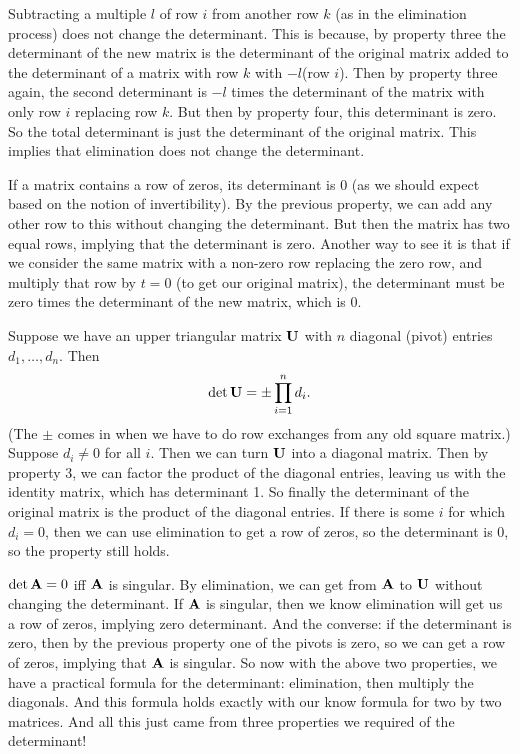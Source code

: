 \item Subtracting a multiple $l$ of row $i$ from another row $k$ (as in the elimination process) does not change the determinant. This is because, by property three the determinant of the new matrix is the determinant of the original matrix added to the determinant of a matrix with row $k$ with $-l$(row $i$). Then by property three again, the second determinant is $-l$ times the determinant of the matrix with only row $i$ replacing row $k$. But then by property four, this determinant is zero. So the total determinant is just the determinant of the original matrix. This implies that elimination does not change the determinant. 
\item If a matrix contains a row of zeros, its determinant is 0 (as we should expect based on the notion of invertibility). By the previous property, we can add any other row to this without changing the determinant. But then the matrix has two equal rows, implying that the determinant is zero. Another way to see it is that if we consider the same matrix with a non-zero row replacing the zero row, and multiply that row by $t=0$ (to get our original matrix), the determinant must be zero times the determinant of the new matrix, which is 0.
\item Suppose we have an upper triangular matrix $\boldsymbol{\mathbf{U}}$ with $n$ diagonal (pivot) entries $d_1, \ldots, d_n$. Then 
\[ \mathrm{det}\, \boldsymbol{\mathbf{U}} = \pm \prod_{i=1}^n d_i. \]
(The $\pm$ comes in when we have to do row exchanges from any old square matrix.) Suppose $d_i \ne 0$ for all $i$. Then we can turn $\boldsymbol{\mathbf{U}}$ into a diagonal matrix. Then by property 3, we can factor the product of the diagonal entries, leaving us with the identity matrix, which has determinant 1. So finally the determinant of the original matrix is the product of the diagonal entries. If there is some $i$ for which $d_i = 0$, then we can use elimination to get a row of zeros, so the determinant is 0, so the property still holds.
\item $\mathrm{det}\, \boldsymbol{\mathbf{A}} = 0$ iff $\boldsymbol{\mathbf{A}}$ is singular. By elimination, we can get from $\boldsymbol{\mathbf{A}}$ to $\boldsymbol{\mathbf{U}}$ without changing the determinant. If $\boldsymbol{\mathbf{A}}$ is singular, then we know elimination will get us a row of zeros, implying zero determinant. And the converse: if the determinant is zero, then by the previous property one of the pivots is zero, so we can get a row of zeros, implying that $\boldsymbol{\mathbf{A}}$ is singular. 
\brm
So now with the above two properties, we have a practical formula for the determinant: elimination, then multiply the diagonals. And this formula holds exactly with our know formula for two by two matrices. And all this just came from three properties we required of the determinant!
